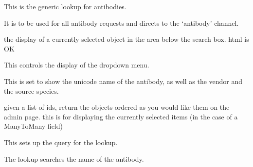 \documentclass[letterpaper,10pt,english]{sphinxmanual}
\begin{document}
\begin{fulllineitems}
\label{api:experimentdb.reagents.lookups.AntibodyLookup}
This is the generic lookup for antibodies.


It is to be used for all antibody requests and directs to the `antibody' channel.


\begin{fulllineitems}
\label{api:experimentdb.reagents.lookups.AntibodyLookup.format_item}
the display of a currently selected object in the area below the search box. html is OK


\end{fulllineitems}


\begin{fulllineitems}
\label{api:experimentdb.reagents.lookups.AntibodyLookup.format_result}
This controls the display of the dropdown menu.


This is set to show the unicode name of the antibody, as well as the vendor and the source species.


\end{fulllineitems}


\begin{fulllineitems}
\label{api:experimentdb.reagents.lookups.AntibodyLookup.get_objects}
given a list of ids, return the objects ordered as you would like them on the admin page.
this is for displaying the currently selected items (in the case of a ManyToMany field)


\end{fulllineitems}


\begin{fulllineitems}
\label{api:experimentdb.reagents.lookups.AntibodyLookup.get_query}
This sets up the query for the lookup.


The lookup searches the name of the antibody.


\end{fulllineitems}


\end{fulllineitems}
\end{document}
